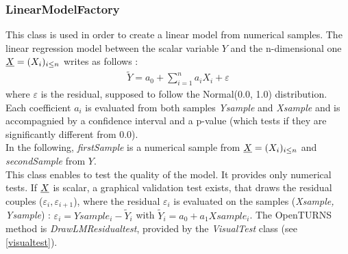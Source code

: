 \subsubsection{LinearModelFactory}

This class is used in order to create a linear model from numerical samples.
The linear regression model between the scalar variable $Y$ and the n-dimensional one ${\underline{X}} = (X_i)_{i \leq n}$ writes as follows :
\begin{align*}
\tilde{Y} = a_0 + \sum_{i=1}^n a_i X_i + \varepsilon
\end{align*}
where $\varepsilon$ is the residual, supposed to follow the Normal(0.0, 1.0) distribution.\\
Each coefficient $a_i$ is evaluated from both samples {\itshape Ysample} and {\itshape Xsample} and is accompagnied by a confidence interval and a p-value (which tests if they are significantly different from 0.0).\\

In the following, {\itshape firstSample} is a numerical sample from ${\underline{X}} = (X_i)_{i \leq n}$ and  {\itshape secondSample}  from  $Y$.\\

This class enables to test the quality of the model. It provides only numerical tests. If ${\underline{X}}$ is scalar, a graphical validation test exists, that draws the residual couples ($\varepsilon_i, \varepsilon_{i+1}$), where the residual $\varepsilon_i$ is evaluated on the samples  ({\itshape Xsample, Ysample}) : $\varepsilon_i = Ysample_i - \tilde{Y}_i$ with $\tilde{Y}_i = a_0 + a_1 Xsample_i$. The OpenTURNS method is {\itshape DrawLMResidualtest}, provided by the {\itshape VisualTest} class (see \ref{visualtest}).

